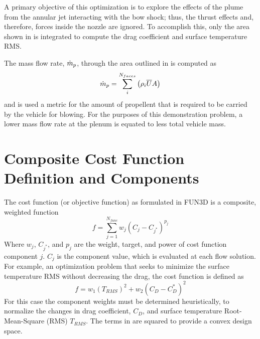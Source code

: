 A primary objective of this optimization is to explore the effects of the plume
from the annular jet interacting with the bow shock; thus, the thrust effects
and, therefore, forces inside the nozzle are ignored.  To accomplish this, only
the area shown in  is integrated to compute the drag
coefficient and surface temperature RMS.

The mass flow rate, $\dot{m}_p$,
through the area outlined in  is computed as
\begin{equation}
  \dot{m}_p = \sum_{i}^{N_{faces}}\left( \rho_i \overline{U} A \right)
  \label{mass-flow-eqn}
\end{equation}
and is used a metric for the amount of propellent that is required to be carried
by the vehicle for blowing.  For the purposes of this demonstration problem, a
lower mass flow rate at the plenum is equated to less total vehicle mass.

\section{Composite Cost Function Definition and Components}
\label{cost-func-components}

The cost function (or objective function) as formulated in FUN3D is a composite,
weighted function
\begin{equation}
  f = \sum_{j=1}^{N_{func}}w_j\left( C_j - C_{j^*} \right)^{p_j}
  \label{generic-cost-function}
\end{equation}
Where $w_j$, $C_{j^*}$, and $p_j$ are the weight, target, and power of cost
function component $j$.  $C_j$ is the component value, which is evaluated at
each flow solution.  For example, an optimization problem that seeks to minimize the
surface temperature RMS without decreasing the drag, the cost function is
defined as 
\begin{equation}
  f = w_1\left( T_{RMS} \right)^{2} + w_2\left( C_{D} - C_{D}^{*} \right)^2
  \label{cd-tt-cost-function}
\end{equation}
For this case the component weights must be determined heuristically, to normalize
the changes in drag coefficient, $C_D$, and surface temperature Root-Mean-Square
(RMS) $T_{RMS}$.  The terms in  are squared to provide
a convex design space.

